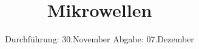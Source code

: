 

\subject{Fortgeschrittenen Praktikum -- WS 15/16}
\title{Mikrowellen}
\date{
  Durchführung: 30.November
  \hspace{3em}
  Abgabe: 07.Dezember
}



\maketitle
\thispagestyle{empty}
\tableofcontents
\newpage






\printbibliography


